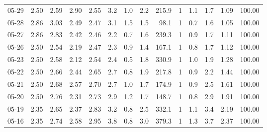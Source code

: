 \begin{threeparttable}
{\begin{tabular}{lrrrrrrrrrrrrr}
  05-29 &          2.50 &          2.59 &          2.90 &        2.55 &                 3.2 &                 1.0 &        2.2 &        215.9 &              1 &                 1.1 &              1.7 &            1.09 &                 100.00 \\
  05-28 &          2.86 &          3.03 &          2.49 &        2.47 &                 3.1 &                 1.5 &        1.5 &         98.1 &              1 &                 0.7 &              1.6 &            1.05 &                 100.00 \\
  05-27 &          2.86 &          2.83 &          2.42 &        2.46 &                 2.2 &                 0.7 &        1.6 &        239.3 &              1 &                 0.9 &              1.7 &            1.11 &                 100.00 \\
  05-26 &          2.50 &          2.54 &          2.19 &        2.47 &                 2.3 &                 0.9 &        1.4 &        167.1 &              1 &                 0.8 &              1.7 &            1.12 &                 100.00 \\
  05-23 &          2.50 &          2.58 &          2.12 &        2.54 &                 2.4 &                 0.5 &        1.8 &        330.9 &              1 &                 1.0 &              1.9 &            1.28 &                 100.00 \\
  05-22 &          2.50 &          2.66 &          2.44 &        2.65 &                 2.7 &                 0.8 &        1.9 &        217.8 &              1 &                 0.9 &              2.2 &            1.44 &                 100.00 \\
  05-21 &          2.50 &          2.68 &          2.57 &        2.70 &                 2.7 &                 1.0 &        1.7 &        174.9 &              1 &                 0.9 &              2.5 &            1.61 &                 100.00 \\
  05-20 &          2.50 &          2.76 &          2.31 &        2.73 &                 2.9 &                 1.2 &        1.7 &        148.7 &              1 &                 0.8 &              2.9 &            1.91 &                 100.00 \\
  05-19 &          2.35 &          2.65 &          2.37 &        2.83 &                 3.2 &                 0.8 &        2.5 &        332.1 &              1 &                 1.1 &              3.4 &            2.19 &                 100.00 \\
  05-16 &          2.35 &          2.74 &          2.58 &        2.95 &                 3.8 &                 0.8 &        3.0 &        379.3 &              1 &                 1.3 &              3.7 &            2.37 &                 100.00 \\

\end{tabular}}
\end{threeparttable}
